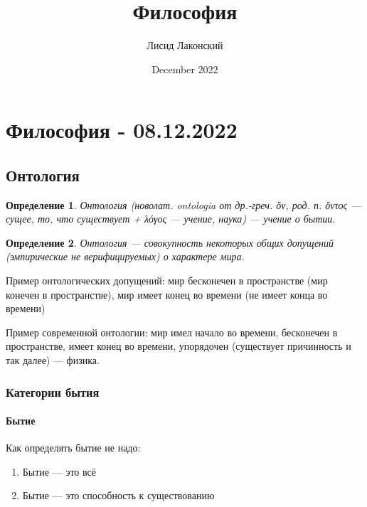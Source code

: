 \documentclass{article}
\title{Философия}
\author{Лисид Лаконский}
\date{December 2022}
\newtheorem{definition}{Определение}
\begin{document}
\maketitle
\tableofcontents
\pagebreak

\section{Философия - 08.12.2022}

\subsection{Онтология}

\begin{flushleft}

\begin{definition}
Онтология (новолат. ontologia от др.-греч. \textgreek{ὄν}, род. п. \textgreek{ὄντος} — сущее, то, что существует + \textgreek{λόγος} — учение, наука) — учение о бытии.
\end{definition}

\begin{definition}
Онтология — совокупность некоторых общих допущений (эмпирические не верифицируемых) о характере мира.
\end{definition}

Пример онтологических допущений: мир бесконечен в пространстве (мир конечен в пространстве), мир имеет конец во времени (не имеет конца во времени)

Пример современной онтологии: мир имел начало во времени, бесконечен в пространстве, имеет конец во времени, упорядочен (существует причинность и так далее) — физика.

\subsubsection{Категории бытия}

\paragraph{Бытие}

Как определять бытие не надо:

\begin{enumerate}
    \item Бытие — это всё
    \item Бытие — это способность к существованию
\end{enumerate}


\end{flushleft}
\end{document}
